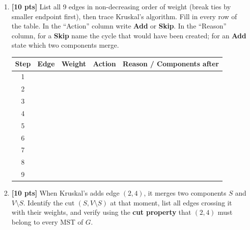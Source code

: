 \documentclass[9pt]{book}
\begin{document}
\begin{enumerate}[label=\arabic*.]
\begin{center}
\end{center}

\begin{enumerate}[label=(\alph*)]

    \item \textbf{[10 pts]} List all 9 edges in non-decreasing order of weight (break ties by smaller endpoint first), then trace Kruskal's algorithm.  Fill in every row of the table.  In the ``Action'' column write \textbf{Add} or \textbf{Skip}.  In the ``Reason'' column, for a \textbf{Skip} name the cycle that would have been created; for an \textbf{Add} state which two components merge.

    \bigskip
    \begin{center}
    \renewcommand{\arraystretch}{1.6}
    \begin{tabular}{c|c|c|c|l}
    \hline
    \textbf{Step} & \textbf{Edge} & \textbf{Weight} & \textbf{Action} & \quad\textbf{Reason / Components after} \\
    \hline
    1 & & & & \\
    2 & & & & \\
    3 & & & & \\
    4 & & & & \\
    5 & & & & \\
    6 & & & & \\
    7 & & & & \\
    8 & & & & \\
    9 & & & & \\
    \hline
    \end{tabular}
    \end{center}


    \item \textbf{[10 pts]} When Kruskal's adds edge $(2, 4)$, it merges two components $S$ and $V \setminus S$.
    Identify the cut $(S, V \setminus S)$ at that moment, list all edges crossing it with their weights, and verify using the \textbf{cut property} that $(2,4)$ must belong to every MST of $G$.


\end{enumerate}
\end{enumerate}
\end{document}
